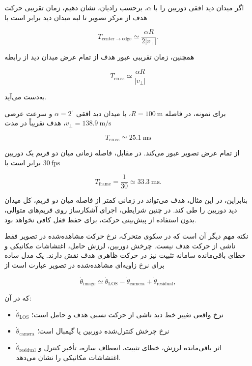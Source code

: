 \documentclass[12pt,a4paper]{article}
\begin{document}
اگر میدان دید افقی دوربین را با
\(\alpha\)،
برحسب رادیان، نشان دهیم، زمان تقریبی حرکت هدف از مرکز تصویر تا
لبه میدان دید برابر است با

\begin{equation}
	T_{\mathrm{center\rightarrow edge}}
	\simeq
	\frac{
		\alpha R
	}{
		2|v_{\perp}|
	}.
	\label{eq:center-to-edge-time}
\end{equation}

همچنین، زمان تقریبی عبور هدف از تمام عرض میدان دید از رابطه

\begin{equation}
	\boxed{
		T_{\mathrm{cross}}
		\simeq
		\frac{
			\alpha R
		}{
			|v_{\perp}|
		}
	}
	\label{eq:field-of-view-crossing-time}
\end{equation}

به‌دست می‌آید.

برای نمونه، در فاصله
\(R=100~\mathrm{m}\)،
با میدان دید افقی
\(\alpha=2^{\circ}\)
و سرعت عرضی
\(v_{\perp}=138.9~\mathrm{m/s}\)،
هدف تقریباً در مدت

\begin{equation}
	T_{\mathrm{cross}}
	\simeq
	25.1~\mathrm{ms}
\end{equation}

از تمام عرض تصویر عبور می‌کند. در مقابل، فاصله زمانی میان دو فریم
یک دوربین
\(30~\mathrm{fps}\)
برابر است با

\begin{equation}
	T_{\mathrm{frame}}
	=
	\frac{1}{30}
	\simeq
	33.3~\mathrm{ms}.
\end{equation}

بنابراین، در این مثال، هدف می‌تواند در زمانی کمتر از فاصله میان دو
فریم، کل میدان دید دوربین را طی کند. در چنین شرایطی، اجرای آشکارساز
روی فریم‌های متوالی، بدون استفاده از پیش‌بینی حرکت، برای حفظ قفل
کافی نخواهد بود.

نکته مهم دیگر آن است که در سکوی متحرک، نرخ حرکت مشاهده‌شده در
تصویر فقط ناشی از حرکت هدف نیست. چرخش دوربین، لرزش حامل، اغتشاشات
مکانیکی و خطای باقی‌مانده سامانه تثبیت نیز در حرکت ظاهری هدف نقش
دارند. یک مدل ساده برای نرخ زاویه‌ای مشاهده‌شده در تصویر عبارت است
از

\begin{equation}
	\dot{\theta}_{\mathrm{image}}
	\simeq
	\dot{\theta}_{\mathrm{LOS}}
	-
	\dot{\theta}_{\mathrm{camera}}
	+
	\dot{\theta}_{\mathrm{residual}},
	\label{eq:image-angular-rate}
\end{equation}

که در آن:

\begin{itemize}
	\item
	\(\dot{\theta}_{\mathrm{LOS}}\)
	نرخ واقعی تغییر خط دید ناشی از حرکت نسبی هدف و حامل است؛
	
	\item
	\(\dot{\theta}_{\mathrm{camera}}\)
	نرخ چرخش کنترل‌شده دوربین یا گیمبال است؛
	
	\item
	\(\dot{\theta}_{\mathrm{residual}}\)
	اثر باقی‌مانده لرزش، خطای تثبیت، انعطاف سازه، تأخیر کنترل و
	اغتشاشات مکانیکی را نشان می‌دهد.
\end{itemize}
\end{document}
